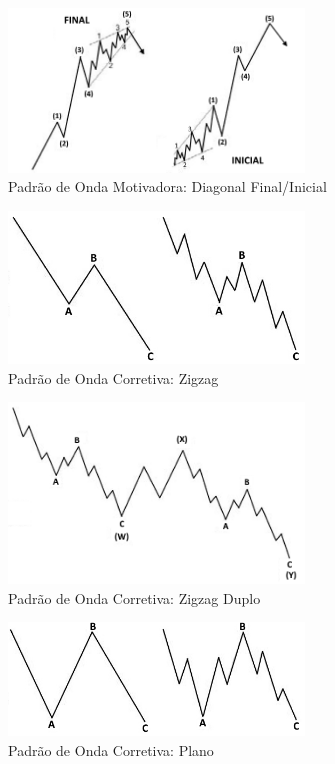 \documentclass[12pt]{article}
\begin{document}
\begin{figure}[H]
	\centering
	\includegraphics[width=0.7\textwidth]{EW_pattern_04.png}
	\caption{Padrão de Onda Motivadora: Diagonal Final/Inicial}\label{fig:EW_pattern_04}
\end{figure}

\begin{figure}[H]
	\centering
	\includegraphics[width=0.7\textwidth]{EW_pattern_05.png}
	\caption{Padrão de Onda Corretiva: Zigzag}\label{fig:EW_pattern_05}
\end{figure}

\begin{figure}[H]
	\centering
	\includegraphics[width=0.7\textwidth]{EW_pattern_06.png}
	\caption{Padrão de Onda Corretiva: Zigzag Duplo}\label{fig:EW_pattern_06}
\end{figure}

\begin{figure}[H]
	\centering
	\includegraphics[width=0.7\textwidth]{EW_pattern_07.png}
	\caption{Padrão de Onda Corretiva: Plano}\label{fig:EW_pattern_07}
\end{figure}
\end{document}
